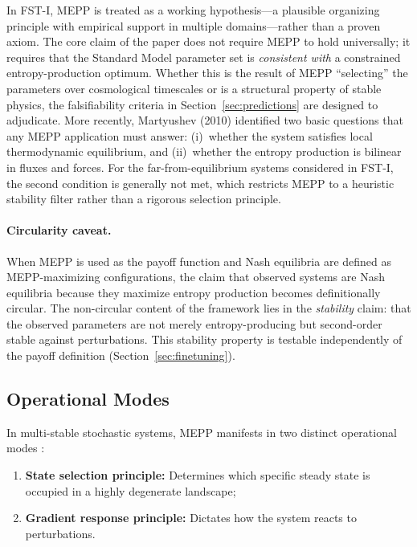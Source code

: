 \documentclass[12pt,a4paper]{article}
\theoremstyle{remark}
\begin{document}
In FST-I, MEPP is treated as a working hypothesis---a plausible organizing principle with empirical support in multiple domains---rather than a proven axiom. The core claim of the paper does not require MEPP to hold universally; it requires that the Standard Model parameter set is \emph{consistent with} a constrained entropy-production optimum. Whether this is the result of MEPP ``selecting'' the parameters over cosmological timescales or is a structural property of stable physics, the falsifiability criteria in Section~\ref{sec:predictions} are designed to adjudicate. More recently, Martyushev (2010) \citep{Martyushev2010} identified two basic questions that any MEPP application must answer: (i)~whether the system satisfies local thermodynamic equilibrium, and (ii)~whether the entropy production is bilinear in fluxes and forces. For the far-from-equilibrium systems considered in FST-I, the second condition is generally not met, which restricts MEPP to a heuristic stability filter rather than a rigorous selection principle.

\paragraph{Circularity caveat.} When MEPP is used as the payoff function and Nash equilibria are defined as MEPP-maximizing configurations, the claim that observed systems are Nash equilibria because they maximize entropy production becomes definitionally circular. The non-circular content of the framework lies in the \emph{stability} claim: that the observed parameters are not merely entropy-producing but second-order stable against perturbations. This stability property is testable independently of the payoff definition (Section~\ref{sec:finetuning}).

\subsection{Operational Modes}

In multi-stable stochastic systems, MEPP manifests in two distinct operational modes \citep{MEPP2023}:
\begin{enumerate}
    \item \textbf{State selection principle:} Determines which specific steady state is occupied in a highly degenerate landscape;
    \item \textbf{Gradient response principle:} Dictates how the system reacts to perturbations.
\end{enumerate}
\end{document}
